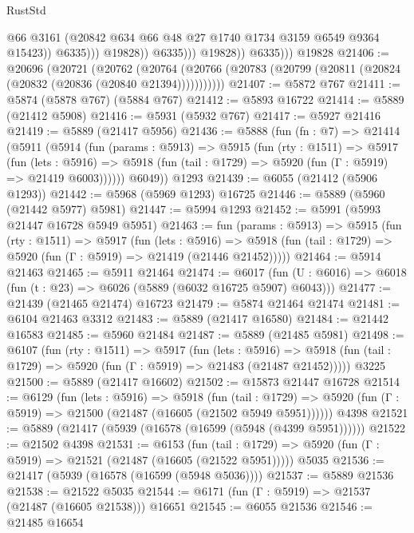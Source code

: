 \begin{lexlean}{RustStd}
\begin{coremodule}
                                @66
                                @3161
                                (@20842 @634 @66 @48 @27 @1740 @1734 @3159 @6549 @9364 @15423))
                              @6335)))
                        @19828))
                    @6335)))
              @19828))
          @6335)))
    @19828
@21406 := @20696
    (@20721
      (@20762
        (@20764 (@20766 (@20783 (@20799 (@20811 (@20824 (@20832 (@20836 (@20840 @21394)))))))))))
@21407 := @5872 @767
@21411 := @5874 (@5878 @767) (@5884 @767)
@21412 := @5893 @16722
@21414 := @5889 (@21412 @5908)
@21416 := @5931 (@5932 @767)
@21417 := @5927 @21416
@21419 := @5889 (@21417 @5956)
@21436 := @5888
    (fun (fn : @7) =>
    @21414
      (@5911
        (@5914
          (fun (params : @5913) =>
          @5915
            (fun (rty : @1511) =>
            @5917
              (fun (lets : @5916) =>
              @5918 (fun (tail : @1729) => @5920 (fun (Γ : @5919) => @21419 @6003))))))
        @6049))
    @1293
@21439 := @6055 (@21412 (@5906 @1293))
@21442 := @5968 (@5969 @1293) @16725
@21446 := @5889 (@5960 (@21442 @5977) @5981)
@21447 := @5994 @1293
@21452 := @5991 (@5993 @21447 @16728 @5949 @5951)
@21463 := fun (params : @5913) =>
  @5915
    (fun (rty : @1511) =>
    @5917
      (fun (lets : @5916) =>
      @5918 (fun (tail : @1729) => @5920 (fun (Γ : @5919) => @21419 (@21446 @21452)))))
@21464 := @5914 @21463
@21465 := @5911 @21464
@21474 := @6017
    (fun (U : @6016) => @6018 (fun (t : @23) => @6026 (@5889 (@6032 @16725 @5907) @6043)))
@21477 := @21439 (@21465 @21474) @16723
@21479 := @5874 @21464 @21474
@21481 := @6104 @21463 @3312
@21483 := @5889 (@21417 @16580)
@21484 := @21442 @16583
@21485 := @5960 @21484
@21487 := @5889 (@21485 @5981)
@21498 := @6107
    (fun (rty : @1511) =>
    @5917
      (fun (lets : @5916) =>
      @5918 (fun (tail : @1729) => @5920 (fun (Γ : @5919) => @21483 (@21487 @21452)))))
    @3225
@21500 := @5889 (@21417 @16602)
@21502 := @15873 @21447 @16728
@21514 := @6129
    (fun (lets : @5916) =>
    @5918
      (fun (tail : @1729) =>
      @5920 (fun (Γ : @5919) => @21500 (@21487 (@16605 (@21502 @5949 @5951))))))
    @4398
@21521 := @5889 (@21417 (@5939 (@16578 (@16599 (@5948 (@4399 @5951))))))
@21522 := @21502 @4398
@21531 := @6153
    (fun (tail : @1729) => @5920 (fun (Γ : @5919) => @21521 (@21487 (@16605 (@21522 @5951)))))
    @5035
@21536 := @21417 (@5939 (@16578 (@16599 (@5948 @5036))))
@21537 := @5889 @21536
@21538 := @21522 @5035
@21544 := @6171 (fun (Γ : @5919) => @21537 (@21487 (@16605 @21538))) @16651
@21545 := @6055 @21536
@21546 := @21485 @16654

\end{coremodule}
\end{lexlean}
